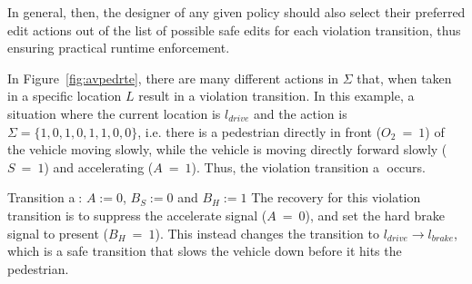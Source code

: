 In general, then, the designer of any given policy should also select their preferred edit actions out of the list of possible safe edits for each violation transition, thus ensuring practical runtime enforcement.

\begin{example}
	In Figure~\ref{fig:avpedrte}, there are many different actions in $\Sigma$ that, when taken in a specific location $L$ result in a violation transition.
	In this example, a situation where the current location is $l_{drive}$ and the action is $\Sigma = \{1, 0, 1, 0, 1, 1, 0, 0\}$, i.e. there is a pedestrian directly in front ($O_2~=~1$) of the vehicle moving slowly, while the vehicle is moving directly forward slowly ($S~=~1$) and accelerating ($A~=~1$).
	Thus, the violation transition \textcircled{a} occurs.
	\squishlist
	\item Transition \textcircled{a}: $A := 0$, $B_S := 0$ and $B_H := 1$
	\squishend
	The recovery for this violation transition is to suppress the accelerate signal ($A~=~0$), and set the hard brake signal to present ($B_H~=~1$).
	This instead changes the transition to $l_{drive} \rightarrow l_{brake}$, which is a safe transition that slows the vehicle down before it hits the pedestrian.
\end{example}














